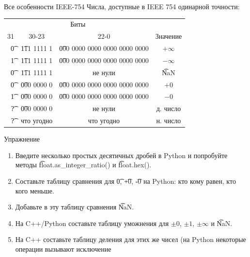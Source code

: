 \begin{frame}{Все особенности IEEE-754}
	Числа, доступные в IEEE 754 одинарной точности:
	\begin{center}
		\begin{tabular}{r|c|c|c}
			\multicolumn{3}{c}{Биты} & \\
			31 & 30-23 & 22-0 & Значение \\\hline
			\t{0} & \t{111 1111 1} & \t{000 0000 0000 0000 0000 0000} & $+\infty $\\
			\t{1} & \t{111 1111 1} & \t{000 0000 0000 0000 0000 0000} & $-\infty $\\
			\t{0} & \t{111 1111 1} & не нули                          & \t{NaN} \\
			\t{0} & \t{000 0000 0} & \t{000 0000 0000 0000 0000 0000} & $+0$ \\
			\t{1} & \t{000 0000 0} & \t{000 0000 0000 0000 0000 0000} & $-0$ \\
			\t{?} & \t{000 0000 0} & не нули                          & д. число \\
			\t{?} & что угодно     & что угодно                       & н. число \\
		\end{tabular}
	\end{center}	
\end{frame}

\begin{frame}{Упражнение}
	\begin{enumerate}
		\item
			Введите несколько простых десятичных дробей в Python и попробуйте методы \t{float.as\_integer\_ratio()} и \t{float.hex()}.
		\item
			Составьте таблицу сравнения для \t{0}, \t{+0}, \t{-0} на Python: кто кому равен, кто кого меньше.
		\item
			Добавьте в эту таблицу сравнения \t{NaN}.
		\item
			На C++/Python составьте таблицу уможнения для $\pm0$, $\pm 1$, $\pm \infty$ и \t{NaN}.
		\item
			На C++ составьте таблицу деления для этих же чисел (на Python некоторые операции вызывают исключение
	\end{enumerate}
\end{frame}
